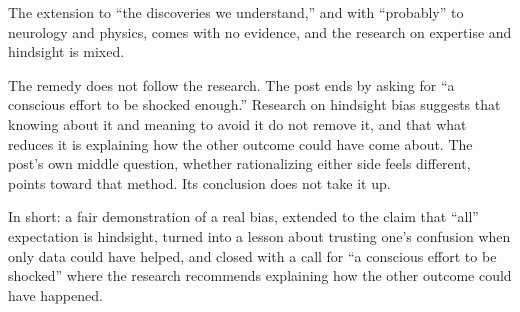 \begin{afterword}
The extension to ``the discoveries we understand,'' and with ``probably'' to neurology and physics, comes with no evidence, and the research on expertise and hindsight is mixed.

The remedy does not follow the research. The post ends by asking for ``a conscious effort to be shocked enough.'' Research on hindsight bias suggests that knowing about it and meaning to avoid it do not remove it, and that what reduces it is explaining how the other outcome could have come about. The post's own middle question, whether rationalizing either side feels different, points toward that method. Its conclusion does not take it up.

In short: a fair demonstration of a real bias, extended to the claim that ``all'' expectation is hindsight, turned into a lesson about trusting one's confusion when only data could have helped, and closed with a call for ``a conscious effort to be shocked'' where the research recommends explaining how the other outcome could have happened.
\end{afterword}
